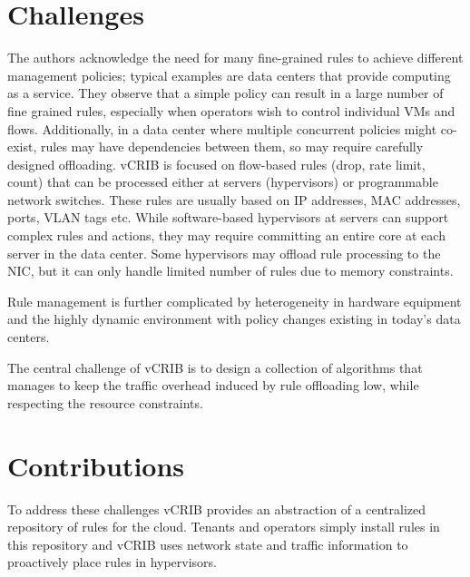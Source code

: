 \documentclass[letterpaper,twocolumn,10pt]{article}
\begin{document}
\section{Challenges}
The authors acknowledge the need for many fine-grained rules to achieve different management policies; typical examples are data centers that provide computing as a service. They observe that a simple policy can result in a large number of fine grained rules, especially when operators wish to control individual VMs and flows.
Additionally, in a data center where multiple concurrent policies might co-exist, rules may have dependencies between them, so may require carefully designed offloading.
vCRIB is focused on flow-based rules (drop, rate limit, count) that can be processed either at servers (hypervisors) or programmable network switches. These rules are usually based on IP addresses, MAC addresses, ports, VLAN tags etc.
While software-based hypervisors at servers can support complex rules and actions, they may require committing an entire core at each server in the data center.
Some hypervisors may offload rule processing to the NIC, but it can only handle limited number of rules due to memory constraints.

Rule management is further complicated by heterogeneity in hardware equipment and the highly dynamic environment with policy changes existing in today's data centers.

The central challenge of vCRIB is to design a collection of algorithms that manages to keep the traffic overhead induced by rule offloading low, while respecting the resource constraints.

\section{Contributions}
To address these challenges vCRIB provides an abstraction of a centralized repository of rules for the cloud. Tenants and operators simply install rules in this repository and vCRIB uses network state and traffic information to proactively place rules in hypervisors.
\end{document}
